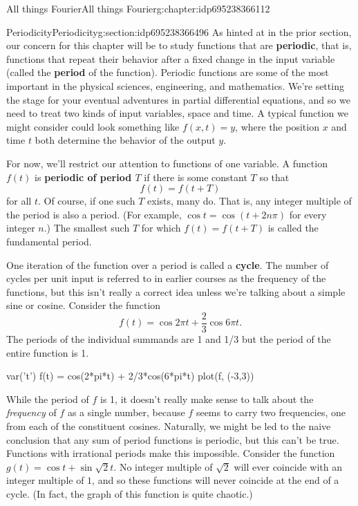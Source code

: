 \documentclass[oneside,10pt,]{book}
\newcommand{\terminology}[1]{\textbf{#1}}
\numberwithin{equation}{section}
\numberwithin{equation}{section}
\begin{document}
\begin{chapterptx}{All things Fourier}{}{All things Fourier}{}{}{g:chapter:idp695238366112}
%
%
\typeout{************************************************}
\typeout{************************************************}
%
\begin{sectionptx}{Periodicity}{}{Periodicity}{}{}{g:section:idp695238366496}
As hinted at in the prior section, our concern for this chapter will be to study functions that are \terminology{periodic}, that is, functions that repeat their behavior after a fixed change in the input variable (called the \terminology{period} of the function). Periodic functions are some of the most important in the physical sciences, engineering, and mathematics. We're setting the stage for your eventual adventures in partial differential equations, and so we need to treat two kinds of input variables, space and time. A typical function we might consider could look something like \(f(x, t) = y\), where the position \(x\) and time \(t\) both determine the behavior of the output \(y\).%
\par
For now, we'll restrict our attention to functions of one variable. A function \(f(t)\) is \terminology{periodic of period \(T\)} if there is some constant \(T\) so that%
\begin{equation*}
f(t) = f(t + T)
\end{equation*}
for all \(t\). Of course, if one such \(T\) exists, many do. That is, any integer multiple of the period is also a period.  (For example, \(\cos t = \cos (t + 2n\pi)\) for every integer \(n\).) The smallest such \(T\) for which \(f(t) = f(t + T)\) is called the fundamental period.%
\par
One iteration of the function over a period is called a \terminology{cycle}. The number of cycles per unit input is referred to in earlier courses as the frequency of the functions, but this isn't really a correct idea unless we're talking about a simple sine or cosine. Consider the function%
\begin{equation*}
f(t) = \cos 2\pi t + \frac{2}{3} \cos 6\pi t.
\end{equation*}
The periods of the individual summands are 1 and 1\slash{}3 but the period of the entire function is 1.%
\begin{sageinput}
var('t')
f(t) = cos(2*pi*t) + 2/3*cos(6*pi*t)
plot(f, (-3,3))
\end{sageinput}
While the period of \(f\) is 1, it doesn't really make sense to talk about the \emph{frequency} of \(f\) as a single number, because \(f\) seems to carry two frequencies, one from each of the constituent cosines. Naturally, we might be led to the naive conclusion that any sum of period functions is periodic, but this can't be true. Functions with irrational periods make this impossible. Consider the function \(g(t) = \cos t + \sin \sqrt{2} t\). No integer multiple of \(\sqrt{2}\) will ever coincide with an integer multiple of \(1\), and so these functions will never coincide at the end of a cycle. (In fact, the graph of this function is quite chaotic.)%

\end{sectionptx}
\end{chapterptx}
\end{document}
